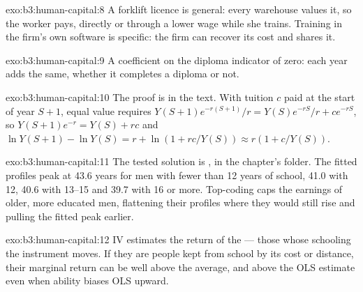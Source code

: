 \begin{solution}{exo:b3:human-capital:8}
A forklift licence is general: every warehouse values it, so the worker pays,
directly or through a lower wage while she trains. Training in the firm's own
software is specific: the firm can recover its cost and shares it.
\end{solution}

\begin{solution}{exo:b3:human-capital:9}
A coefficient on the diploma indicator of zero: each year adds the same, whether it
completes a diploma or not.
\end{solution}

\begin{solution}{exo:b3:human-capital:10}
The proof is in the text. With tuition $c$ paid at the start of year $S + 1$, equal value requires
$Y(S+1)e^{-r(S+1)}/r = Y(S)e^{-rS}/r + ce^{-rS}$, so $Y(S+1)e^{-r} = Y(S) + rc$ and $\ln Y(S+1) - \ln Y(S) = r + \ln(1 + rc/Y(S)) \approx r(1 + c/Y(S))$.
\end{solution}

\begin{solution}{exo:b3:human-capital:11}
The tested solution is , in the chapter's 
folder. The fitted profiles peak at 43.6 years for men with fewer than 12 years of
school, 41.0 with 12, 40.6 with 13--15 and 39.7 with 16 or more. %
Top-coding caps the earnings of older, more educated men, flattening their profiles
where they would still rise and pulling the fitted peak earlier.
\end{solution}

\begin{solution}{exo:b3:human-capital:12}
IV estimates the return of the  --- those whose schooling the instrument
moves. If they are people kept from school by its cost or distance, their marginal
return can be well above the average, and above the OLS estimate even when ability
biases OLS upward.
\end{solution}

